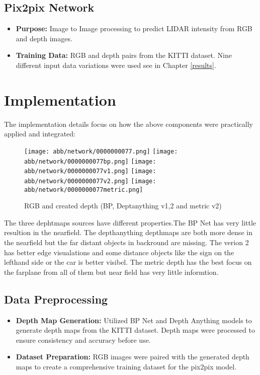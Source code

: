 \subsection{Pix2pix Network}
\begin{itemize}
	\item \textbf{Purpose:} Image to Image processing to predict LIDAR intensity from RGB and depth images.
	\item \textbf{Training Data:} RGB and depth pairs from the KITTI dataset.
	Nine different input data variations were used see in Chapter \ref{results}.
\end{itemize}

\section{Implementation}
The implementation details focus on how the above components were practically applied and integrated:
\begin{figure}[!ht]
	\centering
	\texttt{[image: abb/network/0000000077.png]}
	\texttt{[image: abb/network/0000000077bp.png]}
	\texttt{[image: abb/network/0000000077v1.png]}
	\texttt{[image: abb/network/0000000077v2.png]}
	\texttt{[image: abb/network/0000000077metric.png]}
	\caption{RGB and created depth (BP, Deptanything v1,2 and metric v2)}
	\label{rgb_depths}
\end{figure}
The three dephtmaps sources have different properties.The BP Net has very little resultion in the nearfield. The depthanything depthmaps are both more dense in the nearfield but the far distant objects in backround are missing. The verion 2 has better edge visualations and some distance objects like the sign on the lefthand side or the car is better visibel. The metric depth has the best focus on the farplane from all of them but near field has very little informtion.  
\subsection{Data Preprocessing}
\begin{itemize}
	\item \textbf{Depth Map Generation:} Utilized BP Net and Depth Anything models to generate depth maps from the KITTI dataset. Depth maps were processed to ensure consistency and accuracy before use.
	\item \textbf{Dataset Preparation:} RGB images were paired with the generated depth maps to create a comprehensive training dataset for the pix2pix model.
\end{itemize}

